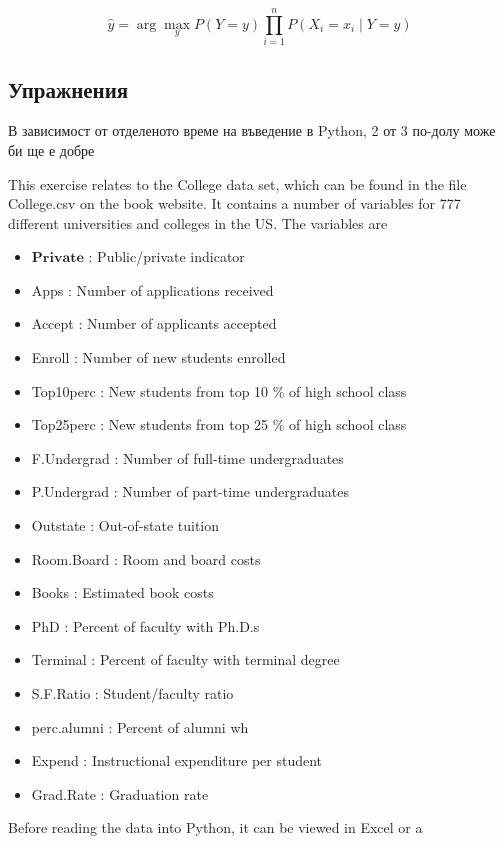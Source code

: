 		\begin{equation}
		\hat{y} = \arg\max_{y} P(Y = y) \prod_{i=1}^{n} P(X_i = x_i \mid Y = y)
		\end{equation}
		
	
	
	
	\subsection{Упражнения}
	В зависимост от отделеното време на въведение в Python,
	2 от 3 по-долу може би ще е добре
	
	\begin{exercise}[2.8]
		This exercise relates to the College data set, which can be found in
		the file College.csv on the book website. It contains a number of
		variables for 777 different universities and colleges in the US. The
		variables are
		\begin{itemize}
			\item $\mathbf{Private}$ : Public/private indicator
			\item Apps : Number of applications received
			\item Accept : Number of applicants accepted
			\item Enroll : Number of new students enrolled
			\item Top10perc : New students from top 10 \% of high school class
			\item Top25perc : New students from top 25 \% of high school class
			\item F.Undergrad : Number of full-time undergraduates
			\item P.Undergrad : Number of part-time undergraduates
			\item Outstate : Out-of-state tuition
			\item Room.Board : Room and board costs
			\item Books : Estimated book costs
			\item PhD : Percent of faculty with Ph.D.s
			\item  Terminal : Percent of faculty with terminal degree
			\item S.F.Ratio : Student/faculty ratio
			\item perc.alumni : Percent of alumni wh
			\item Expend : Instructional expenditure per student
			\item Grad.Rate : Graduation rate
		\end{itemize}
	 Before reading the data into Python, it can be viewed in Excel or a

\end{exercise}
